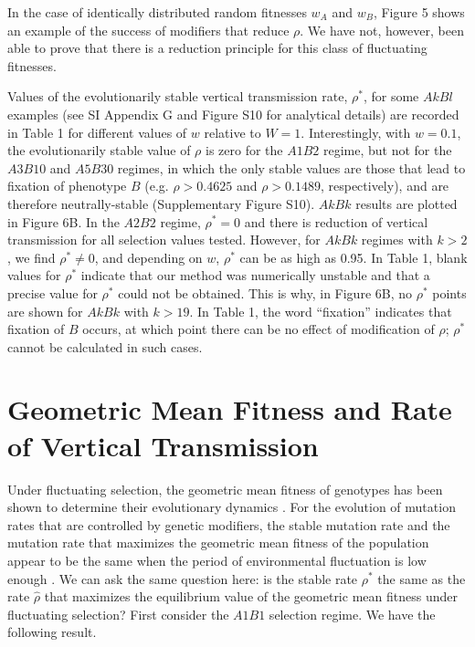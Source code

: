 \documentclass[9pt,twocolumn,twoside,lineno]{pnas-new}
\begin{document}
 In the case of identically distributed random fitnesses $w_A$ and $w_B$, Figure 5 shows  an example of the success of modifiers that reduce $\rho$. We have not, however, been able to prove that there is a reduction principle for this class of fluctuating fitnesses.
  

Values of the evolutionarily stable vertical transmission rate, $\rho^*$, for some $AkBl$ examples (see SI Appendix G and  Figure S10 for analytical details) are recorded in Table 1 for different values of $w$ relative to $W=1$.
Interestingly, with $w=0.1$, the evolutionarily stable value of $\rho$ is zero for the $A1B2$ regime, but not for the $A3B10$ and $A5B30$ regimes, in which the only stable values are those that lead to fixation of phenotype $B$ (e.g. $\rho>0.4625$ and $\rho>0.1489$, respectively), and are therefore neutrally-stable (Supplementary Figure S10).
$AkBk$ results are plotted in Figure 6B.
In the $A2B2$ regime, $\rho^* =0$ and there is reduction of vertical transmission for all selection values tested.
However, for $AkBk$ regimes with $k>2$, we find $\rho^*\ne 0$, and depending on $w$, $\rho^*$ can be as high as 0.95.
In Table 1, blank values for $\rho^*$ indicate that our method was numerically unstable  and that a precise value for $\rho^*$ could not be obtained.
This is why, in Figure 6B, no $\rho^*$ points are shown for $AkBk$ with $k>19$.
In Table 1, the word ``fixation'' indicates that fixation of $B$ occurs, at which point there can be no effect of modification of $\rho$; $\rho^*$ cannot be calculated in such cases.

\section{Geometric Mean Fitness and Rate of Vertical Transmission}

Under fluctuating selection, the geometric mean fitness of genotypes has been shown to determine their evolutionary dynamics \cite{haldane1963polymorphism,karlin1974random,wakano2004evolution}. For the evolution of mutation rates that are controlled by genetic modifiers, the stable mutation rate and the mutation rate that maximizes the geometric mean fitness of the population appear to be the same when the period of environmental fluctuation is low enough \cite{liberman2011evolution}. We can ask the same question here: is the stable rate $\rho^*$ the same as the rate $\hat\rho$ that maximizes the equilibrium value of the geometric mean fitness under fluctuating selection?
First consider the $A1B1$ selection regime. We have the following result.
\medskip
\end{document}

